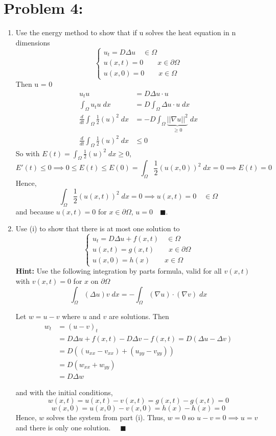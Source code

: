 \documentclass[12pt]{article}
\newcommand{\qed}{\quad \blacksquare}
\begin{document}
\section*{Problem 4:}
\begin{enumerate}
    \item Use the energy method to show that if u solves the heat equation in n dimensions
    \[\begin{cases}
        u_t = D\Delta u \quad \in \Omega\\
        u(x, t) = 0 \qquad x \in \partial \Omega\\
        u(x, 0) = 0 \qquad x \in \Omega
    \end{cases}\]
    Then u = 0
    \color{blue}
    \begin{align*}
        u_tu &= D\Delta u\cdot u\\
        \int_{\Omega} u_t u \; dx &= D \int_{\Omega}\Delta u\cdot u\; dx\\
        \frac{d}{dt}\int_{\Omega} \frac{1}{2}(u)^2 \; dx &= -D\int_{\Omega} \underbrace{||\nabla u||^2}_{\geq 0}\; dx\\
        \frac{d}{dt}\int_{\Omega} \frac{1}{2}(u)^2 \; dx &\leq 0
    \end{align*}
    So with $E(t) = \int_{\Omega} \frac{1}{2}(u)^2 \; dx \geq 0$, 
    \[E'(t) \leq 0 \implies 0 \leq E(t) \leq E(0) = \int_{\Omega} \frac{1}{2}(u(x, 0))^2 \; dx = 0 \implies E(t) = 0\]
    Hence, 
    \[\int_{\Omega} \frac{1}{2}(u(x, t))^2 \; dx = 0 \implies u(x, t) = 0 \quad \in \Omega\] 
    and because $u(x, t) = 0$ for $x \in \partial \Omega$, $u = 0 \qed$.
    \color{black}

    \item Use (i) to show that there is at most one solution to 
    \[\begin{cases}
        u_t = D\Delta u + f(x, t) \quad \in \Omega\\
        u(x, t) = g(x,  t) \qquad x \in \partial \Omega\\
        u(x, 0) = h(x) \qquad x \in \Omega
    \end{cases}\]
   \textbf{Hint:} Use the following integration by parts formula, valid for all $v(x, t)$ with $v(x, t) = 0$ for $x$ on $\partial \Omega$
   \[\int_{\Omega} (\Delta u) v\; dx = -\int_{\Omega}(\nabla u) \cdot (\nabla v)\; dx\]

   \color{blue}
   Let $w = u - v$ where $u$ and $v$ are solutions. Then 
   \begin{align*}
        w_t &= (u - v)_t\\
        & = D\Delta u + f(x, t) - D\Delta v - f(x, t) = D(\Delta u - \Delta v) \\
        &= D((u_{xx} - v_{xx}) + (u_{yy} - v_{yy}))\\
        &= D(w_{xx} + w_{yy})\\
        &= D\Delta w
   \end{align*}
  
   and with the initial conditions,
   \[w(x, t) = u(x, t) - v(x, t) = g(x, t) - g(x, t)= 0\]
   \[w(x, 0) = u(x, 0) - v(x, 0) = h(x) - h(x) = 0\]
   Hence, $w$ solves the system from part (i). Thus, $w = 0$ so $u - v = 0 \implies u = v$ and there is only one solution. $\qed$
   \color{black}
\end{enumerate}
\end{document}
